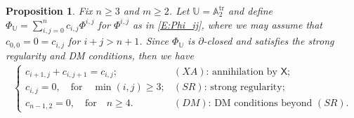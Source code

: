 \documentclass[10pt,a4paper]{amsart}
\DeclareMathOperator{\tr}{tr}
\newcommand\bbU{\mathbb{U}}
\newcommand\bbA{\mathbb{A}}
\newcommand\sfX{\mathsf{X}}
\numberwithin{equation}{section}
\newtheorem{Proposition}[Theorem]{Proposition}
 { \theoremstyle{definition}
\newtheorem{Definition}[Theorem]{Definition}
\newtheorem{Note}[Theorem]{Note}
\newtheorem{Example}[Theorem]{Example}
\newtheorem{Remark}[Theorem]{Remark} }
\begin{document}
\begin{Proposition}\label{P:GS} Fix $n \geq 3$ and $m \geq 2$. Let $\bbU = \bbA_2^{\tr}$ and define $\Phi_{\bbU} = \sum_{i,j=0}^n c_{i,j}\Phi^{i,j}$ for $\Phi^{i,j}$ as in \eqref{E:Phi_ij}, where we may assume that $c_{0,0} = 0 =c_{i,j}$ for $i+j>n+1$. Since $\Phi_\bbU$ is $\partial$-closed and satisfies the strong regularity and DM conditions, then we have
\begin{align} \label{E:GS}
\begin{cases}
c_{i+1,j} + c_{i,j+1} = c_{i,j};& \text{$(XA)$: annihilation by $\sfX$;}\\
c_{i,j}{}= 0,\quad \text{for}\quad \min(i,j)\ge 3;&\text{$(SR)$: strong regularity;}\\
c_{n-1,2}= 0,\quad \text{for}\quad n\ge 4. & \text{$(DM)$: DM conditions beyond $(SR)$.}
\end{cases}
\end{align}
\end{Proposition}
\end{document}
